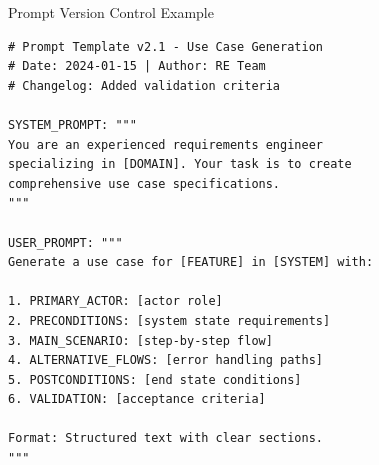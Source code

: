 \documentclass{beamer}
\begin{document}

\begin{frame}[fragile]{Prompt Version Control Example}
    \lstset{style=code}
    \begin{lstlisting}[caption={Version-Controlled Prompt Template}]
# Prompt Template v2.1 - Use Case Generation
# Date: 2024-01-15 | Author: RE Team
# Changelog: Added validation criteria

SYSTEM_PROMPT: """
You are an experienced requirements engineer 
specializing in [DOMAIN]. Your task is to create 
comprehensive use case specifications.
"""

USER_PROMPT: """
Generate a use case for [FEATURE] in [SYSTEM] with:

1. PRIMARY_ACTOR: [actor role]
2. PRECONDITIONS: [system state requirements]
3. MAIN_SCENARIO: [step-by-step flow]
4. ALTERNATIVE_FLOWS: [error handling paths]
5. POSTCONDITIONS: [end state conditions]
6. VALIDATION: [acceptance criteria]

Format: Structured text with clear sections.
"""
    \end{lstlisting}
\end{frame}
\end{document}
